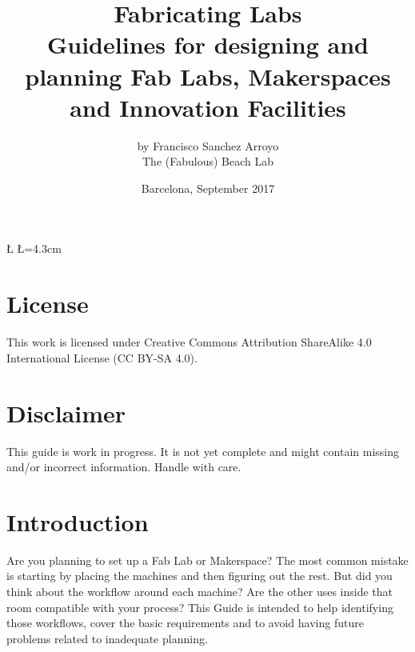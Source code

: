 \documentclass[a4paper,12pt,titlepage]{article}
\title{Fabricating Labs\\
\Huge \textbf{Guidelines for designing and planning Fab Labs, Makerspaces and Innovation Facilities}}
\author{
by Francisco Sanchez Arroyo\\
The (Fabulous) Beach Lab
}
\date{Barcelona, September 2017}
\begin{document}

\newcommand{\D}{6} %
\newcommand{\U}{5} %

\newdimen\R %
\R=3.5cm 
\newdimen\L %
\L=4.3cm


\newcommand{\A}{360/\D} %

\maketitle

\tableofcontents %
\clearpage






\pagestyle{fancy}

\section*{License}
This work is licensed under Creative Commons Attribution ShareAlike 4.0 International License (CC BY-SA 4.0). 

\section*{Disclaimer}
This guide is work in progress. It is not yet complete and might contain missing and/or incorrect information. Handle with care.

\section{Introduction}

Are you planning to set up a Fab Lab or Makerspace? The most common mistake is starting by placing the machines and then figuring out the rest. But did you think about the workflow around each machine? Are the other uses inside that room compatible with your process?  This Guide is intended to help identifying those workflows, cover the basic requirements and to avoid having future problems related to inadequate planning.
\end{document}
